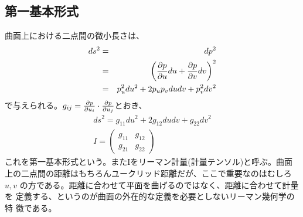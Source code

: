         \subsection{第一基本形式}
            曲面上における二点間の微小長さは、
            \begin{eqnarray*}
                ds^2 &=& dp^2\\
                &=& \lr{\pd[p]{u}du+\pd[p]{v}dv}^2\\
                &=& p_u^2du^2+2p_up_vdudv+p_v^2dv^2
            \end{eqnarray*}
            で与えられる。$g_{ij}=\pd[p]{u_i}\cdot \pd[p]{u_j}$とおき、
            \begin{gather*}
                ds^2 = g_{11}du^2+2g_{12}dudv+g_{22}dv^2 \\
                I = \begin{pmatrix}
                    g_{11} & g_{12}\\
                    g_{21} & g_{22}
                   \end{pmatrix}
            \end{gather*}
            これを第一基本形式という。またIをリーマン計量(計量テンソル)と呼ぶ。曲面
            上の二点間の距離はもちろんユークリッド距離だが、ここで重要なのはむしろ$u,v$
            の方である。距離に合わせて平面を曲げるのではなく、距離に合わせて計量を
            定義する、というのが曲面の外在的な定義を必要としないリーマン幾何学の特
            徴である。

